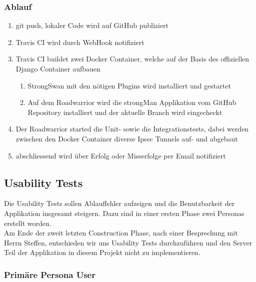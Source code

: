 \subsubsection{Ablauf}
\begin{enumerate}
	\item git push, lokaler Code wird auf GitHub publiziert
	\item Travis CI wird durch WebHook notifiziert
	\item Travis CI buildet zwei Docker Container, welche auf der Basis des offiziellen Django Container aufbauen 
	\begin{enumerate}
         \item StrongSwan mit den nötigen Plugins wird installiert und gestartet
         \item Auf dem Roadwarrior wird die strongMan Applikation vom GitHub Repository installiert und der aktuelle Branch wird eingecheckt
      \end{enumerate}
      \item Der Roadwarrior started die Unit- sowie die Integrationstests, dabei werden zwischen den Docker Container diverse Ipsec Tunnels auf- und abgebaut
      \item abschliessend wird über Erfolg oder Misserfolge per Email notifiziert
\end{enumerate}

\newpage
\subsection{Usability Tests}

Die Usability Tests sollen Ablauffehler aufzeigen und die Benutzbarkeit der Applikation insgesamt steigern. Dazu sind in einer ersten Phase zwei Personas erstellt worden.
\\

Am Ende der zweit letzten Construction Phase, nach einer Besprechung mit Herrn Steffen, entschieden wir uns Usability Tests durchzuführen und den Server Teil der Applikation in diesem Projekt nicht zu implementieren.

\subsubsection{Primäre Persona User}

